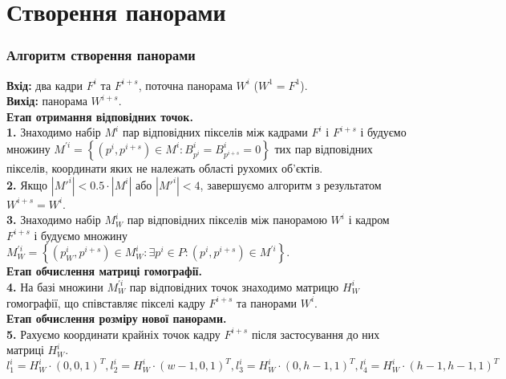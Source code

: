 \section{Створення панорами}
\begin{frame}
  \frametitle{Алгоритм створення панорами}
  \textbf{Вхід:} два кадри \(F^{i}\) та \(F^{i + s}\), поточна панорама \(W^{i}\) (\(W^{1} = F^{1}\)). \\
  \textbf{Вихід:} панорама \(W^{i + s}\). \\
  \textbf{Етап отримання відповідних точок.} \\
  \textbf{1.}
  Знаходимо набір \(M^{i}\) пар відповідних пікселів між кадрами
  \(F^{i}\) і \(F^{i + s}\) і будуємо множину
  \(M^{'i} = \left\{ \left( p^{i},p^{i + s} \right) \in M^{i}:B_{p^{i}}^{i} = B_{p^{i + s}}^{i} = 0 \right\}\)
  тих пар відповідних пікселів, координати яких не належать області
  рухомих об'єктів.\\

  \textbf{2.}
  Якщо \(\left| {M'}^{i} \right| < 0.5 \cdot \left| M^{i} \right|\) або
  \(\left| {M'}^{i} \right| < 4\), завершуємо алгоритм з результатом
  \(W^{i + s} = W^{i}\).\\

  \textbf{3.}
  Знаходимо набір \(M_{W}^{i}\) пар відповідних пікселів між панорамою
  \(W^{i}\) і кадром \(F^{i + s}\) і будуємо множину
  \(M_{W}^{'i} = \left\{ \left( p_{W}^{i},p^{i + s} \right) \in M_{W}^{i}:\exists p^{i} \in P:\left( p^{i},p^{i + s} \right) \in M^{'i} \right\}\). \\

  \textbf{Етап обчислення матриці гомографії.}\\
  \textbf{4.}
  На базі множини \(M_{W}^{'i}\) пар відповідних точок знаходимо матрицю
  \(H_{W}^{i}\) гомографії, що співставляє пікселі кадру \(F^{i + s}\)
  та панорами \(W^{i}\). \\

  \textbf{Етап обчислення розміру нової панорами.} \\
  \textbf{5.}
  Рахуємо координати крайніх точок кадру \(F^{i + s}\) після застосування до них матриці
  \(H_{W}^{i}\).
  $l_{1}^{i} = H_{W}^{i} \cdot (0,0,1)^{T}, l_{2}^{i} = H_{W}^{i} \cdot (w - 1,0,1)^{T},  l_{3}^{i} = H_{W}^{i} \cdot (0,h - 1,1)^{T},l_{4}^{i} = H_{W}^{i} \cdot (h - 1,h - 1,1)^{T}$
 
\end{frame}
